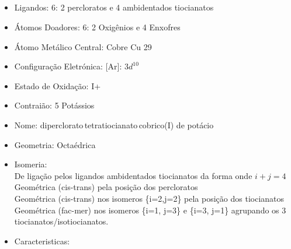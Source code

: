 \documentclass[12pt]{article}
\begin{document}
	\subsection{}
	\begin{itemize}
   
   
   \item Ligandos: 6: 2 percloratos e 4 ambidentados tiocianatos
   
   
   \item Átomos Doadores: 6: 2 Oxigênios e 4 Enxofres
   
   \item Átomo Metálico Central: Cobre Cu 29
   
   \item Configuração Eletrónica: [Ar]: $ 3d^10 $
   
   \item Estado de Oxidação: I+
   
   \item Contraião: 5 Potássios 
   
   \item Nome: diperclorato\,tetratiocianato\,cobrico(I) de potácio
   
   \item Geometria: Octaédrica
   	
   \item Isomeria:\\
   	De ligação pelos ligandos ambidentados tiocianatos da forma  onde $i+j=4$\\
		Geométrica (cis-trans) pela posição dos percloratos\\
		Geométrica (cis-trans) nos isomeros \{i=2,j=2\} pela posição dos tiocianatos\\
		Geométrica (fac-mer) nos isomeros \{i=1, j=3\} e \{i=3, j=1\} agrupando os 3 tiocianatos/isotiocianatos.

	\item Caracteristicas:

	\end{itemize}
	
\break


	
\end{document}
